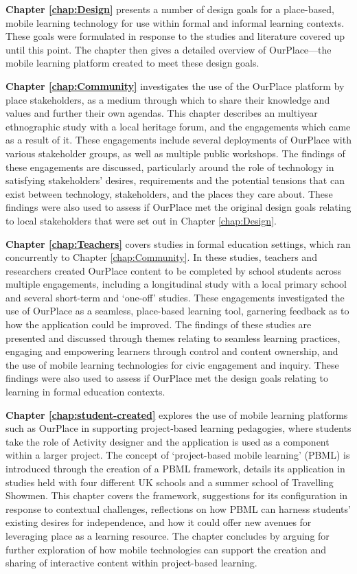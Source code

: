 \textbf{Chapter \ref{chap:Design}} presents a number of design goals for a place-based, mobile learning technology for use within formal and informal learning contexts. These goals were formulated in response to the studies and literature covered up until this point. The chapter then gives a detailed overview of OurPlace---the mobile learning platform created to meet these design goals.

\textbf{Chapter \ref{chap:Community}} investigates the use of the OurPlace platform by place stakeholders, as a medium through which to share their knowledge and values and further their own agendas. This chapter describes an multiyear ethnographic study with a local heritage forum, and the engagements which came as a result of it. These engagements include several deployments of OurPlace with various stakeholder groups, as well as multiple public workshops. The findings of these engagements are discussed, particularly around the role of technology in satisfying stakeholders' desires, requirements and the potential tensions that can exist between technology, stakeholders, and the places they care about. These findings were also used to assess if OurPlace met the original design goals relating to local stakeholders that were set out in Chapter \ref{chap:Design}.

\textbf{Chapter \ref{chap:Teachers}} covers studies in formal education settings, which ran concurrently to Chapter \ref{chap:Community}. In these studies, teachers and researchers created OurPlace content to be completed by school students across multiple engagements, including a longitudinal study with a local primary school and several short-term and `one-off' studies. These engagements investigated the use of OurPlace as a seamless, place-based learning tool, garnering feedback as to how the application could be improved. The findings of these studies are presented and discussed through themes relating to seamless learning practices, engaging and empowering learners through control and content ownership, and the use of mobile learning technologies for civic engagement and inquiry. These findings were also used to assess if OurPlace met the design goals relating to learning in formal education contexts.

\textbf{Chapter \ref{chap:student-created}} explores the use of mobile learning platforms such as OurPlace in supporting project-based learning pedagogies, where students take the role of Activity designer and the application is used as a component within a larger project. The concept of `project-based mobile learning' (PBML) is introduced through the creation of a PBML framework, details its application in studies held with four different UK schools and a summer school of Travelling Showmen. This chapter covers the framework, suggestions for its configuration in response to contextual challenges, reflections on how PBML can harness students’ existing desires for independence, and how it could offer new avenues for leveraging place as a learning resource. The chapter concludes by arguing for further exploration of how mobile technologies can support the creation and sharing of interactive content within project-based learning.

